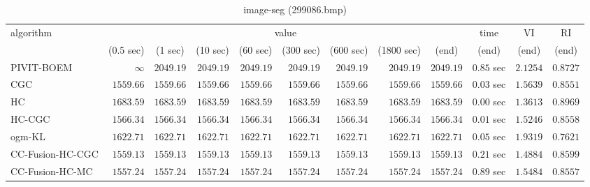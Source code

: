 \begin{table}[H]
\scriptsize
\centering
\caption{image-seg (299086.bmp)}
\label{tab:anytimetable-image-seg-299086.bmp}
\begin{tabular}{lrrrrrrrrrrr}
\toprule
           algorithm &                                   \multicolumn{8}{c}{value} & \multicolumn{1}{c}{time}    & \multicolumn{1}{c}{VI}  & \multicolumn{1}{c}{RI} \\  
\cmidrule(lr){2-9}\cmidrule(lr){10-10} \cmidrule(lr){11-11} \cmidrule(lr){12-12}   
                     & \multicolumn{1}{c}{(0.5 sec)} & \multicolumn{1}{c}{(1 sec)} & \multicolumn{1}{c}{(10 sec)} & \multicolumn{1}{c}{(60 sec)} & \multicolumn{1}{c}{(300 sec)} & \multicolumn{1}{c}{(600 sec)} & \multicolumn{1}{c}{(1800 sec)} & \multicolumn{1}{c}{(end)} & \multicolumn{1}{c}{(end)}    & \multicolumn{1}{c}{(end)}   & \multicolumn{1}{c}{(end)}  \\ \midrule 
          PIVIT-BOEM & $\infty$ & $      2049.19$ & $      2049.19$ & $      2049.19$ & $      2049.19$ & $      2049.19$ & $      2049.19$ & $      2049.19$ & $         0.85$ sec    & $       2.1254$  & $       0.8727$ \\ 
                 CGC & $      1559.66$ & $      1559.66$ & $      1559.66$ & $      1559.66$ & $      1559.66$ & $      1559.66$ & $      1559.66$ & $      1559.66$ & $         0.03$ sec    & $       1.5639$  & $       0.8551$ \\ 
                  HC & $      1683.59$ & $      1683.59$ & $      1683.59$ & $      1683.59$ & $      1683.59$ & $      1683.59$ & $      1683.59$ & $      1683.59$ & $         0.00$ sec    & $       1.3613$  & $       0.8969$ \\ 
              HC-CGC & $      1566.34$ & $      1566.34$ & $      1566.34$ & $      1566.34$ & $      1566.34$ & $      1566.34$ & $      1566.34$ & $      1566.34$ & $         0.01$ sec    & $       1.5246$  & $       0.8558$ \\ 
              ogm-KL & $      1622.71$ & $      1622.71$ & $      1622.71$ & $      1622.71$ & $      1622.71$ & $      1622.71$ & $      1622.71$ & $      1622.71$ & $         0.05$ sec    & $       1.9319$  & $       0.7621$ \\ 
    CC-Fusion-HC-CGC & $      1559.13$ & $      1559.13$ & $      1559.13$ & $      1559.13$ & $      1559.13$ & $      1559.13$ & $      1559.13$ & $      1559.13$ & $         0.21$ sec    & $       1.4884$  & $       0.8599$ \\ 
     CC-Fusion-HC-MC & $      1557.24$ & $      1557.24$ & $      1557.24$ & $      1557.24$ & $      1557.24$ & $      1557.24$ & $      1557.24$ & $      1557.24$ & $         0.89$ sec    & $       1.5484$  & $       0.8557$ \\ 

\end{tabular}
\end{table}
